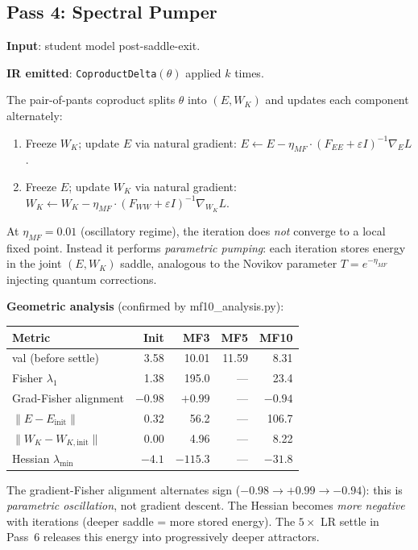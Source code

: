 \documentclass[11pt]{amsart}
\begin{document}
\subsection{Pass 4: Spectral Pumper}

\textbf{Input}: student model post-saddle-exit.

\textbf{IR emitted}: \texttt{CoproductDelta}$(\theta)$ applied $k$ times.

The pair-of-pants coproduct splits $\theta$ into
$(E, W_K)$ and updates each component alternately:
\begin{enumerate}
\item Freeze $W_K$; update $E$ via natural gradient:
  $E \leftarrow E - \eta_{MF} \cdot (F_{EE} + \varepsilon I)^{-1} \nabla_E L$.
\item Freeze $E$; update $W_K$ via natural gradient:
  $W_K \leftarrow W_K - \eta_{MF} \cdot (F_{WW} + \varepsilon I)^{-1} \nabla_{W_K} L$.
\end{enumerate}
At $\eta_{MF} = 0.01$ (oscillatory regime), the iteration
does \emph{not} converge to a local fixed point.
Instead it performs \emph{parametric pumping}: each iteration
stores energy in the joint $(E, W_K)$ saddle,
analogous to the Novikov parameter $T = e^{-\eta_{MF}}$ injecting
quantum corrections.

\textbf{Geometric analysis} (confirmed by mf10\_analysis.py):
\begin{center}
\small
\begin{tabular}{lrrrr}
\toprule
Metric & Init & MF3 & MF5 & MF10 \\
\midrule
val (before settle) & 3.58 & 10.01 & 11.59 & 8.31 \\
Fisher $\lambda_1$ & 1.38 & 195.0 & --- & 23.4 \\
Grad-Fisher alignment & $-0.98$ & $+0.99$ & --- & $-0.94$ \\
$\|E - E_{\text{init}}\|$ & 0.32 & 56.2 & --- & 106.7 \\
$\|W_K - W_{K,\text{init}}\|$ & 0.00 & 4.96 & --- & 8.22 \\
Hessian $\lambda_{\min}$ & $-4.1$ & $-115.3$ & --- & $-31.8$ \\
\bottomrule
\end{tabular}
\end{center}

The gradient-Fisher alignment alternates sign ($-0.98 \to +0.99 \to -0.94$):
this is \emph{parametric oscillation}, not gradient descent.
The Hessian becomes \emph{more negative} with iterations (deeper saddle
= more stored energy). The $5\times$ LR settle in Pass~6 releases
this energy into progressively deeper attractors.
\end{document}
